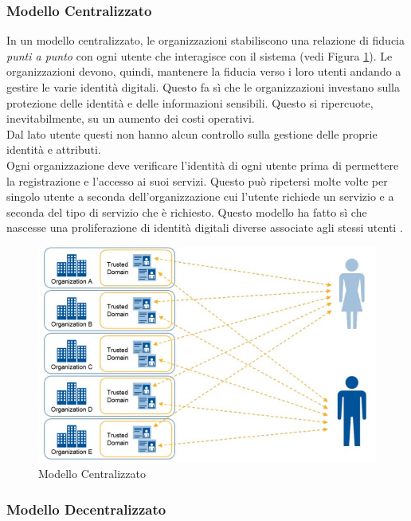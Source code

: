 \subsubsection{Modello Centralizzato}

In un modello centralizzato, le organizzazioni stabiliscono una relazione di fiducia \textit{punti a punto} con ogni utente che interagisce con il sistema (vedi Figura \ref{img:centralizzato}).
Le organizzazioni devono, quindi, mantenere la fiducia verso i loro utenti andando a gestire le varie identità digitali. Questo fa sì che le organizzazioni investano sulla protezione delle identità e delle informazioni sensibili. Questo si ripercuote, inevitabilmente, su un aumento dei costi operativi.\\
Dal lato utente questi non hanno alcun controllo sulla gestione delle proprie identità e attributi.\\
Ogni organizzazione deve verificare l'identità di ogni utente prima di permettere la registrazione e l'accesso ai suoi servizi. Questo può ripetersi molte volte per singolo utente a seconda dell'organizzazione cui l'utente richiede un servizio e a seconda del tipo di servizio che è richiesto. 
Questo modello ha fatto sì che nascesse una proliferazione di identità digitali diverse associate agli stessi utenti \cite{ITF_gartner}.
\begin{figure}[!h]
	\centering
	\includegraphics[scale=0.5]{immagini/ITF_Centralizzato}
	\caption{Modello Centralizzato}
	\label{img:centralizzato}
\end{figure}
\subsubsection{Modello Decentralizzato}

